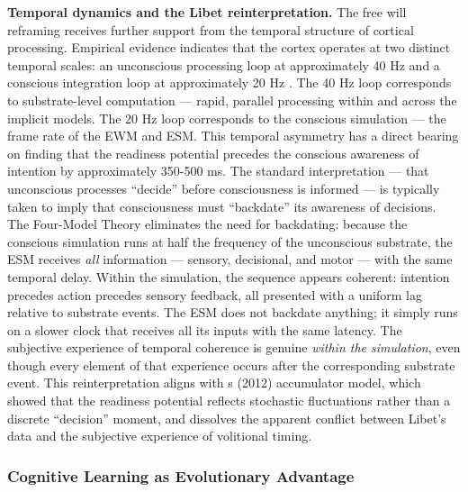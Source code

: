 \documentclass[12pt]{article}
\begin{document}
\textbf{Temporal dynamics and the Libet reinterpretation.} The free will reframing receives further support from the temporal structure of cortical processing. Empirical evidence indicates that the cortex operates at two distinct temporal scales: an unconscious processing loop at approximately 40 Hz and a conscious integration loop at approximately 20 Hz \citep[cf.][]{Gruber2015,Llinas1993,Engel2001}. The 40 Hz loop corresponds to substrate-level computation --- rapid, parallel processing within and across the implicit models. The 20 Hz loop corresponds to the conscious simulation --- the frame rate of the EWM and ESM. This temporal asymmetry has a direct bearing on \citet{Libet1985} finding that the readiness potential precedes the conscious awareness of intention by approximately 350-500 ms. The standard interpretation --- that unconscious processes ``decide'' before consciousness is informed --- is typically taken to imply that consciousness must ``backdate'' its awareness of decisions. The Four-Model Theory eliminates the need for backdating: because the conscious simulation runs at half the frequency of the unconscious substrate, the ESM receives \emph{all} information --- sensory, decisional, and motor --- with the same temporal delay. Within the simulation, the sequence appears coherent: intention precedes action precedes sensory feedback, all presented with a uniform lag relative to substrate events. The ESM does not backdate anything; it simply runs on a slower clock that receives all its inputs with the same latency. The subjective experience of temporal coherence is genuine \emph{within the simulation}, even though every element of that experience occurs after the corresponding substrate event. This reinterpretation aligns with \citeauthor{Schurger2012}\textquotesingle s (2012) accumulator model, which showed that the readiness potential reflects stochastic fluctuations rather than a discrete ``decision'' moment, and dissolves the apparent conflict between Libet's data and the subjective experience of volitional timing.


\subsubsection{Cognitive Learning as Evolutionary Advantage}
\end{document}
